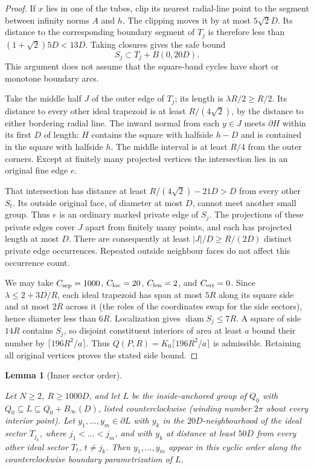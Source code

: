 \documentclass[11pt,a4paper]{article}
\newtheorem{lemma}[definition]{Lemma}
\theoremstyle{remark}
\newcommand{\lean}[1]{}
\newcommand{\uses}[1]{}
\begin{document}
\begin{proof}
If $x$ lies in one of the tubes, clip its nearest radial-line point to
the segment between infinity norms $A$ and $h$.  The clipping moves it
by at most $5\sqrt2D$.  Its distance to the corresponding boundary
segment of $T_j$ is therefore less than
$(1+\sqrt2)5D<13D$.  Taking closures gives the safe bound
\[
 S_j\subset T_j+B(0,20D).
\]
This argument does not assume that the square-band cycles have short or
monotone boundary arcs.

Take the middle half $J$ of the outer edge of $T_j$; its length is
$\lambda R/2\ge R/2$.  Its distance to every other ideal trapezoid is
at least $R/(4\sqrt2)$, by the distance to either bordering radial line.
The inward normal from each $y\in J$ meets $\partial H$ within its
first $D$ of length: $H$ contains the square with halfside $h-D$ and
is contained in the square with halfside $h$.  The middle interval is
at least $R/4$ from the outer corners.  Except at finitely many projected
vertices the intersection lies in an original fine edge $e$.

That intersection has distance at least
$R/(4\sqrt2)-21D>D$ from every other $S_t$.  Its outside original
face, of diameter at most $D$, cannot meet another small group.  Thus
$e$ is an ordinary marked private edge of $S_j$.  The projections of
these private edges cover $J$ apart from finitely many points, and each
has projected length at most $D$.  There are consequently at least
$|J|/D\ge R/(2D)$ distinct private edge occurrences.  Repeated outside
neighbour faces do not affect this occurrence count.

We may take $C_{\rm sep}=1000$, $C_{\rm loc}=20$,
$C_{\rm len}=2$, and $C_{\rm err}=0$.  Since
$\lambda\le2+3D/R$, each ideal trapezoid has span at most $5R$ along
its square side and at most $2R$ across it (the roles of the coordinates
swap for the side sectors), hence diameter less than $6R$.
Localization gives $\operatorname{diam}S_j\le7R$.  A square of side
$14R$ contains $S_j$, so disjoint constituent interiors of area at
least $a$ bound their number by $\lceil196R^2/a\rceil$.
Thus $Q(P,R)=K_0\lceil196R^2/a\rceil$ is admissible.  Retaining all
original vertices proves the stated side bound.
\end{proof}

\begin{lemma}[Inner sector order]
\label{lem:inner-sector-order}
\lean{Tilings.Geometry.quantitativeAnnularGrouping_innerOrder}
\uses{def:mesh,lem:regular-grouping,lem:quantitative-sector}
Let $N\ge2$, $R\ge1000D$, and let $L$ be the inside-anchored group of $Q_0$
with $Q_0\subseteq L\subseteq Q_0+B_\infty(D)$, listed counterclockwise
(winding number $2\pi$ about every interior point).  Let
$y_1,\dots,y_m\in\partial L$ with $y_k$ in the $20D$-neighbourhood of the
ideal sector $T_{j_k}$, where $j_1<\dots<j_m$, and with $y_k$ at distance at
least $50D$ from every other ideal sector $T_t$, $t\ne j_k$.  Then
$y_1,\dots,y_m$ appear in this cyclic order along the counterclockwise
boundary parametrization of $L$.
\end{lemma}
\end{document}
